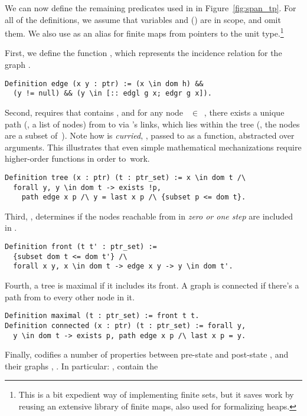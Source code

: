 We can now define the remaining predicates used in  in
Figure~\ref{fig:span_tp}. For all of the definitions, we assume that variables
 and () are in scope, and omit them. We also use
 as an alias for finite maps from pointers to the unit
type.\footnote{This is a bit expedient way of implementing finite
  sets, but it saves work by reusing an extensive library of finite
  maps, also used for formalizing heaps.}

First, we define the function , which represents the
incidence relation for the graph .
%
\begin{lstlisting}
Definition edge (x y : ptr) := (x \in dom h) && 
  (y != null) && (y \in [:: edgl g x; edgr g x]).
\end{lstlisting}
% 
Second,  requires that  contains , and
for any node ~$\in$~, there exists a unique path (\ie,
a list of nodes)  from  to  via 's
links, which lies within the tree (\ie, the nodes  are a subset
of~). Note how  is \emph{curried}, \ie, passed to
 as a function, abstracted over arguments. This illustrates
that even simple mathematical mechanizations require higher-order
functions in order to~work.
%
\begin{lstlisting}
Definition tree (x : ptr) (t : ptr_set) := x \in dom t /\
  forall y, y \in dom t -> exists !p, 
    path edge x p /\ y = last x p /\ {subset p <= dom t}.   
\end{lstlisting} 
%
%
Third, , determines if the nodes reachable from
\code{t} in \emph{zero or one step} are included in \code{t'}.
%
\begin{lstlisting}
Definition front (t t' : ptr_set) :=
  {subset dom t <= dom t'} /\
  forall x y, x \in dom t -> edge x y -> y \in dom t'. 
\end{lstlisting}
%
Fourth, a tree  is maximal if it includes its front. A graph
is connected if there's a path from  to every other node
\code{y} in it.
%
\begin{lstlisting}
Definition maximal (t : ptr_set) := front t t.
Definition connected (x : ptr) (t : ptr_set) := forall y, 
  y \in dom t -> exists p, path edge x p /\ last x p = y.
\end{lstlisting}
%
Finally,  codifies a number of properties between
pre-state  and post-state , and their graphs
\code{g1}, \code{g2}. In particular: \code{g1}, \code{g2} contain the
